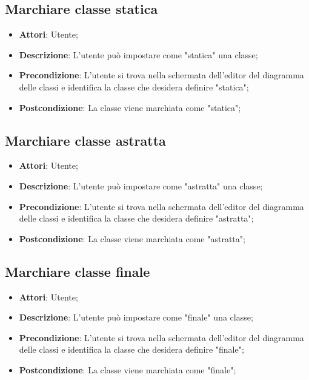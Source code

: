 \documentclass[../AnalisiDeiRequisiti.tex]{subfiles}
\begin{document}
			\subsection{Marchiare classe statica}
			\begin{itemize}
				\item \textbf{Attori}: Utente;
				\item \textbf{Descrizione}: L'utente può impostare come "statica" una classe;
				\item \textbf{Precondizione}: L’utente si trova nella schermata dell'editor del diagramma delle classi e identifica la classe che desidera definire "statica";
				\item \textbf{Postcondizione}: La classe viene marchiata come "statica";
			\end{itemize}
			
			\subsection{Marchiare classe astratta}
			\begin{itemize}
				\item \textbf{Attori}: Utente;
				\item \textbf{Descrizione}: L'utente può impostare come "astratta" una classe;
				\item \textbf{Precondizione}: L’utente si trova nella schermata dell'editor del diagramma delle classi e identifica la classe che desidera definire "astratta";
				\item \textbf{Postcondizione}: La classe viene marchiata come "astratta";
			\end{itemize}
			
			\subsection{Marchiare classe finale}
			\begin{itemize}
				\item \textbf{Attori}: Utente;
				\item \textbf{Descrizione}: L'utente può impostare come "finale" una classe;
				\item \textbf{Precondizione}: L’utente si trova nella schermata dell'editor del diagramma delle classi e identifica la classe che desidera definire "finale";
				\item \textbf{Postcondizione}: La classe viene marchiata come "finale";
			\end{itemize}
			
\end{document}

